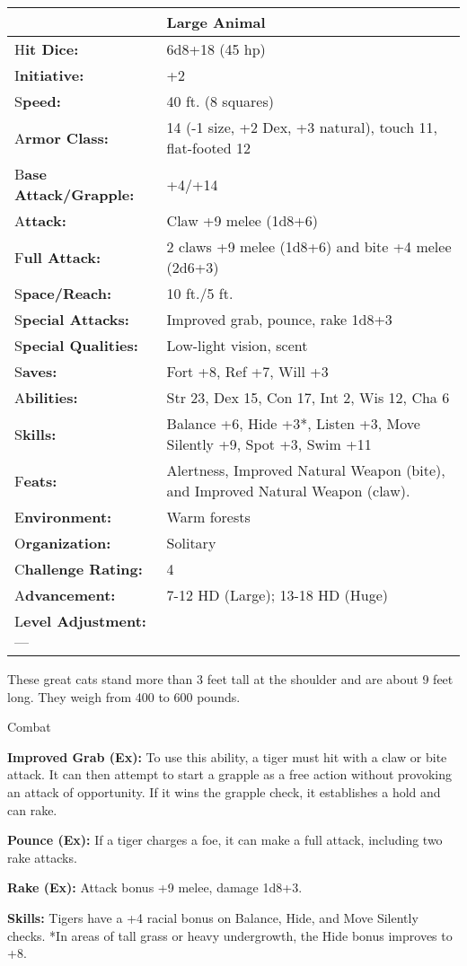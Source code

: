 \documentclass{article}
\begin{document}
\begin{tabular}{|>{\raggedright}p{70pt}|>{\raggedright}p{255pt}|}
\hline
  & Large Animal\tabularnewline
\hline
H\textbf{it Dice:} & 6d8+18 (45 hp)\tabularnewline
\hline
I\textbf{nitiative:} & +2\tabularnewline
\hline
S\textbf{peed:} & 40 ft. (8 squares)\tabularnewline
\hline
A\textbf{rmor Class:} & 14 (-1 size, +2 Dex, +3 natural), touch 11, flat-footed 
12\tabularnewline
\hline
B\textbf{ase Attack/Grapple:} & +4/+14\tabularnewline
\hline
A\textbf{ttack:} & Claw +9 melee (1d8+6)\tabularnewline
\hline
F\textbf{ull Attack:} & 2 claws +9 melee (1d8+6) and bite +4 melee (2d6+3)\tabularnewline
\hline
S\textbf{pace/Reach:} & 10 ft./5 ft.\tabularnewline
\hline
S\textbf{pecial Attacks:} & Improved grab, pounce, rake 1d8+3\tabularnewline
\hline
S\textbf{pecial Qualities:} & Low-light vision, scent\tabularnewline
\hline
S\textbf{aves:} & Fort +8, Ref +7, Will +3\tabularnewline
\hline
A\textbf{bilities:} & Str 23, Dex 15, Con 17, Int 2, Wis 12, Cha 6\tabularnewline
\hline
S\textbf{kills:} & Balance +6, Hide +3*, Listen +3, Move Silently +9, Spot +3, 
Swim +11\tabularnewline
\hline
F\textbf{eats:} & Alertness, Improved Natural Weapon (bite), and Improved Natural 
Weapon (claw).\tabularnewline
\hline
E\textbf{nvironment:} & Warm forests\tabularnewline
\hline
O\textbf{rganization:} & Solitary\tabularnewline
\hline
C\textbf{hallenge Rating:} & 4\tabularnewline
\hline
A\textbf{dvancement:} & 7-12 HD (Large); 13-18 HD (Huge)\tabularnewline
\hline
L\textbf{evel Adjustment:}--- & \tabularnewline
\hline
\end{tabular}

These great cats stand more than 3 feet tall at the shoulder and are about 9 feet 
long. They weigh from 400 to 600 pounds.

Combat

\textbf{Improved Grab (Ex):} To use this ability, a tiger must hit with a claw 
or bite attack. It can then attempt to start a grapple as a free action without 
provoking an attack of opportunity. If it wins the grapple check, it establishes 
a hold and can rake.

\textbf{Pounce (Ex):} If a tiger charges a foe, it can make a full attack, including 
two rake attacks.

\textbf{Rake (Ex): }Attack bonus +9 melee, damage 1d8+3.

\textbf{Skills:} Tigers have a +4 racial bonus on Balance, Hide, and Move Silently 
checks. *In areas of tall grass or heavy undergrowth, the Hide bonus improves to 
+8.
\end{document}
